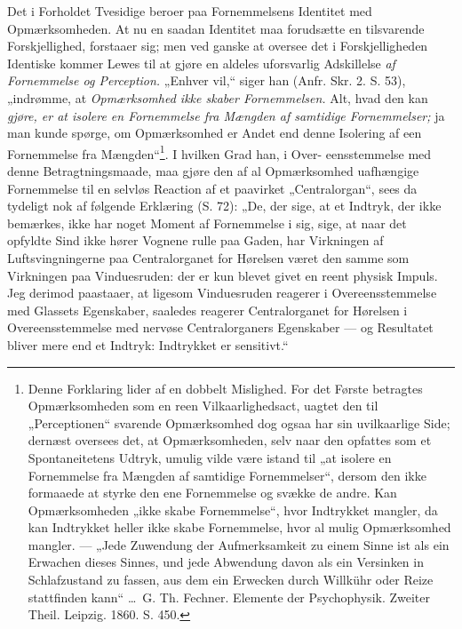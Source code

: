\documentclass[12pt,a4paper]{book}
\begin{document}
Det i Forholdet Tvesidige beroer paa Fornemmelsens Identitet med
Opmærksomheden. At nu en saadan Identitet maa forudsætte en tilsvarende
Forskjellighed, forstaaer sig; men ved ganske at oversee det i Forskjelligheden
Identiske kommer Lewes til at gjøre en aldeles uforsvarlig Adskillelse
\emph{af Fornemmelse og Perception.} „Enhver vil,“ siger han (Anfr. Skr. 2.
S. 53), „indrømme, at \emph{Opmærksomhed ikke skaber Fornemmelsen.} Alt, hvad
den kan \emph{gjøre, er at isolere en Fornemmelse fra Mængden af samtidige
Fornemmelser;} ja man kunde spørge, om Opmærksomhed er Andet end denne
Isolering af een Fornemmelse fra Mængden“\footnote{Denne Forklaring lider af en
dobbelt Mislighed. For det Første betragtes Opmærksomheden som en reen
Vilkaarlighedsact, uagtet den til „Perceptionen“ svarende Opmærksomhed dog ogsaa
har sin uvilkaarlige Side; dernæst oversees det, at Opmærksomheden, selv naar
den opfattes som et Spontaneitetens Udtryk, umulig vilde være istand til „at
isolere en Fornemmelse fra Mængden af samtidige Fornemmelser“, dersom den ikke
formaaede at styrke den ene Fornemmelse og svække de andre. Kan Opmærksomheden
„ikke skabe Fornemmelse“, hvor Indtrykket mangler, da kan Indtrykket heller ikke
skabe Fornemmelse, hvor al mulig Opmærksomhed mangler. --- „Jede Zuwendung der
Aufmerksamkeit zu einem Sinne ist als ein Erwachen dieses Sinnes, und jede
Abwendung davon als ein Versinken in Schlafzustand zu fassen, aus dem ein
Erwecken durch Willkühr oder Reize stattfinden kann“ \dots\ G. Th. Fechner.
Elemente der Psychophysik. Zweiter Theil. Leipzig. 1860. S. 450.}. I hvilken
Grad han, i Over-
eensstemmelse med denne Betragtningsmaade, maa gjøre den af al Opmærksomhed
uafhængige Fornemmelse til en selvløs Reaction af et paavirket „Centralorgan“,
sees da tydeligt nok af følgende Erklæring (S. 72): „De, der sige, at et
Indtryk, der ikke bemærkes, ikke har noget Moment af Fornemmelse i sig, sige,
at naar det opfyldte Sind ikke hører Vognene rulle paa Gaden, har Virkningen af
Luftsvingningerne paa Centralorganet for Hørelsen været den samme som Virkningen
paa Vinduesruden: der er kun blevet givet en reent physisk Impuls. Jeg derimod
paastaaer, at ligesom Vinduesruden reagerer i Overeensstemmelse med Glassets
Egenskaber, saaledes reagerer Centralorganet for Hørelsen i Overeensstemmelse
med nervøse Centralorganers Egenskaber --- og Resultatet bliver mere end et
Indtryk: Indtrykket er sensitivt.“
\end{document}
